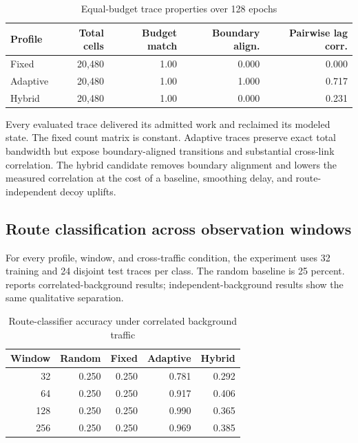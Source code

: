 \documentclass[11pt,oneside]{article}
\begin{document}
\begin{table}[ht]
\centering
\caption{Equal-budget trace properties over 128 epochs}
\label{tab:t3budgetresults}
\begin{tabular}{@{}lrrrr@{}}
\toprule
Profile & Total cells & Budget match & Boundary align. & Pairwise lag corr. \\
\midrule
Fixed & 20,480 & 1.00 & 0.000 & 0.000 \\
Adaptive & 20,480 & 1.00 & 1.000 & 0.717 \\
Hybrid & 20,480 & 1.00 & 0.000 & 0.231 \\
\bottomrule
\end{tabular}
\end{table}

Every evaluated trace delivered its admitted work and reclaimed its modeled state. The fixed count matrix is constant. Adaptive traces preserve exact total bandwidth but expose boundary-aligned transitions and substantial cross-link correlation. The hybrid candidate removes boundary alignment and lowers the measured correlation at the cost of a baseline, smoothing delay, and route-independent decoy uplifts.

\subsection{Route classification across observation windows}

For every profile, window, and cross-traffic condition, the experiment uses 32 training and 24 disjoint test traces per class. The random baseline is 25 percent.  reports correlated-background results; independent-background results show the same qualitative separation.

\begin{table}[ht]
\centering
\caption{Route-classifier accuracy under correlated background traffic}
\label{tab:t3routeclass}
\begin{tabular}{@{}rrrrr@{}}
\toprule
Window & Random & Fixed & Adaptive & Hybrid \\
\midrule
32 & 0.250 & 0.250 & 0.781 & 0.292 \\
64 & 0.250 & 0.250 & 0.917 & 0.406 \\
128 & 0.250 & 0.250 & 0.990 & 0.365 \\
256 & 0.250 & 0.250 & 0.969 & 0.385 \\
\bottomrule
\end{tabular}
\end{table}
\end{document}
